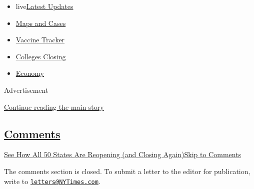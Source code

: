 \begin{itemize}
\tightlist
\item
  live\href{https://www.nytimes3xbfgragh.onion/2020/08/20/world/coronavirus-covid.html?name=styln-coronavirus-national\&region=TOP_BANNER\&variant=undefined\&block=storyline_menu_recirc\&action=click\&pgtype=Interactive\&impression_id=772e6201-e387-11ea-a6c1-6f7a25730905}{Latest
  Updates}
\item
  \href{https://www.nytimes3xbfgragh.onion/interactive/2020/us/coronavirus-us-cases.html?name=styln-coronavirus-national\&region=TOP_BANNER\&variant=undefined\&block=storyline_menu_recirc\&action=click\&pgtype=Interactive\&impression_id=772e6202-e387-11ea-a6c1-6f7a25730905}{Maps
  and Cases}
\item
  \href{https://www.nytimes3xbfgragh.onion/interactive/2020/science/coronavirus-vaccine-tracker.html?name=styln-coronavirus-national\&region=TOP_BANNER\&variant=undefined\&block=storyline_menu_recirc\&action=click\&pgtype=Interactive\&impression_id=772e6203-e387-11ea-a6c1-6f7a25730905}{Vaccine
  Tracker}
\item
  \href{https://www.nytimes3xbfgragh.onion/2020/08/19/us/colleges-closing-covid.html?name=styln-coronavirus-national\&region=TOP_BANNER\&variant=undefined\&block=storyline_menu_recirc\&action=click\&pgtype=Interactive\&impression_id=772e6204-e387-11ea-a6c1-6f7a25730905}{Colleges
  Closing}
\item
  \href{https://www.nytimes3xbfgragh.onion/live/2020/08/20/business/stock-market-today-coronavirus?name=styln-coronavirus-national\&region=TOP_BANNER\&variant=undefined\&block=storyline_menu_recirc\&action=click\&pgtype=Interactive\&impression_id=772e6205-e387-11ea-a6c1-6f7a25730905}{Economy}
\end{itemize}

Advertisement

\protect\hyperlink{after-top}{Continue reading the main story}

\hypertarget{comments}{%
\subsection{\texorpdfstring{\protect\hyperlink{commentsContainer}{Comments}}{Comments}}\label{comments}}

\href{}{See How All 50 States Are Reopening (and Closing
Again)}\href{}{Skip to Comments}

The comments section is closed. To submit a letter to the editor for
publication, write to
\href{mailto:letters@NYTimes.com}{\nolinkurl{letters@NYTimes.com}}.

